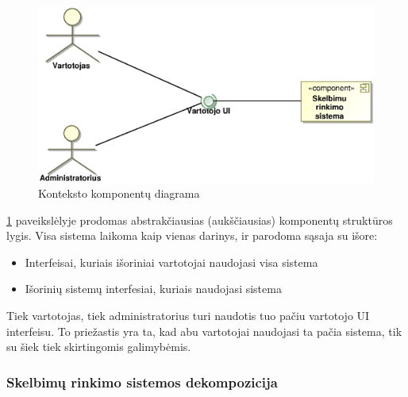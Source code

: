 \documentclass[12pt]{article}
\begin{document}
	\begin{figure}[h]
		\begin{center}
			\includegraphics[width=\textwidth]{Komponentai1.eps}
			\caption{Konteksto komponentų diagrama\label{Components1}}
		\end{center}
	\end{figure}
	
	\ref{Components1} paveikslėlyje prodomas abstrakčiausias (aukščiausias) komponentų struktūros lygis. Visa sistema laikoma kaip vienas darinys, ir parodoma sąsaja su išore:
	
	\begin{itemize}	
		\item Interfeisai, kuriais išoriniai vartotojai naudojasi visa sistema
		\item Išorinių sistemų interfesiai, kuriais naudojasi sistema
	\end{itemize}
	
	Tiek vartotojas, tiek administratorius turi naudotis tuo pačiu vartotojo UI interfeisu. To priežastis yra ta, kad abu vartotojai naudojasi ta pačia sistema, tik su šiek tiek skirtingomis galimybėmis.	
	\pagebreak

	\subsubsection{Skelbimų rinkimo sistemos dekompozicija}
\end{document}
